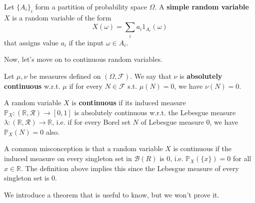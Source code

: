 \documentclass{article}
\begin{document}
      \begin{definition}
        Let $\{A_i\}_i$ form a partition of probability space $\Omega$. A \textbf{simple random variable} $X$ is a random variable of the form 
        \begin{equation}
          X (\omega) = \sum_{i} a_i 1_{A_i} (\omega)
        \end{equation}
        that assigns value $a_i$ if the input $\omega \in A_i$. 
      \end{definition}

      Now, let's move on to continuous random variables. 

      \begin{definition}
        Let $\mu, \nu$ be measures defined on $(\Omega, \mathcal{F})$. We say that $\nu$ is \textbf{absolutely continuous} w.r.t. $\mu$ if for every $N \in \mathcal{F}$ s.t. $\mu(N) = 0$, we have $\nu(N) = 0$. 
      \end{definition}

      \begin{definition}
        A random variable $X$ is \textbf{continuous} if its induced measure $\mathbb{P}_X: (\mathbb{R}, \mathcal{R}) \rightarrow [0, 1]$ is absolutely continuous w.r.t. the Lebesgue measure $\lambda: (\mathbb{R}, \mathcal{R}) \rightarrow \mathbb{R}$, i.e. if for every Borel set $N$ of Lebesgue measure $0$, we have $\mathbb{P}_X (N) = 0$ also. 
      \end{definition}

      A common misconception is that a random variable $X$ is continuous if the induced measure on every singleton set in $\mathcal{B}(R)$ is $0$, i.e. $\mathbb{P}_X (\{x\}) = 0$ for all $x \in \mathbb{R}$. The definition above implies this since the Lebesgue measure of every singleton set is $0$. 

      We introduce a theorem that is useful to know, but we won't prove it. 
\end{document}
